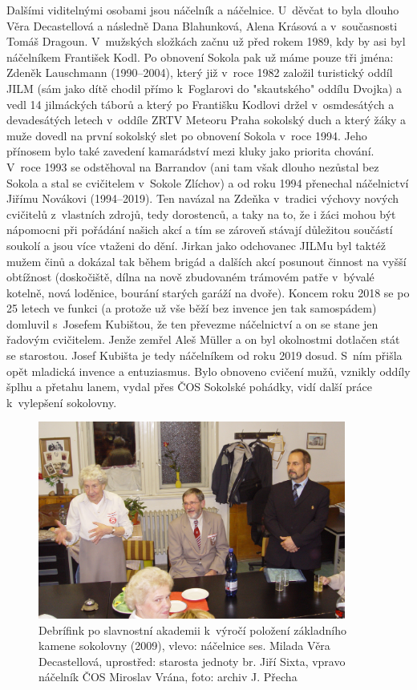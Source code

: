 \documentclass[a5paper, 11pt, twoside]{article}
\begin{document}
Dalšími viditelnými osobami jsou náčelník a náčelnice. U~děvčat to byla
dlouho Věra Decastellová a následně Dana Blahunková, Alena Krásová a
v~současnosti Tomáš Dragoun. V~mužských složkách začnu už před rokem 1989,
kdy by asi byl náčelníkem František Kodl. Po obnovení Sokola pak už máme
pouze tři jména: Zdeněk Lauschmann (1990--2004), který již v~roce 1982
založil turistický oddíl JILM (sám jako dítě chodil přímo k~Foglarovi do
"skautského" oddílu Dvojka) a vedl 14 jilmáckých táborů a který po
Františku Kodlovi držel v~osmdesátých a devadesátých letech v~oddíle
ZRTV Meteoru Praha sokolský duch a který žáky a muže dovedl na první
sokolský slet po obnovení Sokola v~roce 1994. Jeho přínosem bylo také
zavedení kamarádství mezi kluky jako priorita chování. V~roce 1993 se
odstěhoval na Barrandov (ani tam však dlouho nezůstal bez Sokola a stal
se cvičitelem v~Sokole Zlíchov) a od roku 1994 přenechal náčelnictví
Jiřímu Novákovi (1994--2019). Ten navázal na Zdeňka
v~tradici výchovy nových cvičitelů z~vlastních zdrojů, tedy dorostenců, a
taky na to, že i žáci mohou být nápomocni při pořádání našich akcí a tím
se zároveň stávají důležitou součástí soukolí a jsou více vtaženi do
dění. Jirkan jako odchovanec JILMu byl taktéž mužem činů a dokázal tak
během brigád a dalších akcí posunout činnost na vyšší obtížnost
(doskočiště, dílna na nově zbudovaném trámovém patře v~bývalé kotelně,
nová loděnice, bourání starých garáží na dvoře). Koncem roku 2018 se po
25 letech ve funkci (a protože už vše běží bez invence jen tak
samospádem) domluvil s~Josefem Kubištou, že ten převezme náčelnictví a
on se stane jen řadovým cvičitelem. Jenže zemřel Aleš Müller a on byl
okolnostmi dotlačen stát se starostou. Josef Kubišta je tedy náčelníkem
od roku 2019 dosud. S~ním přišla opět mladická invence a entuziasmus.
Bylo obnoveno cvičení mužů, vznikly oddíly šplhu a přetahu lanem, vydal
přes ČOS Sokolské pohádky, vidí další práce k~vylepšení sokolovny.

\begin{figure}[h!]
  \centering 
  \includegraphics[width=0.9\textwidth]{img/49_debrifink.JPG}
  \caption*{Debrífink po slavnostní akademii k~výročí položení základního
  kamene sokolovny (2009), vlevo: náčelnice ses. Milada Věra Decastellová,
  uprostřed: starosta jednoty br. Jiří Sixta, vpravo náčelník ČOS Miroslav
  Vrána, foto: archiv J. Přecha}
\end{figure}
\end{document}

